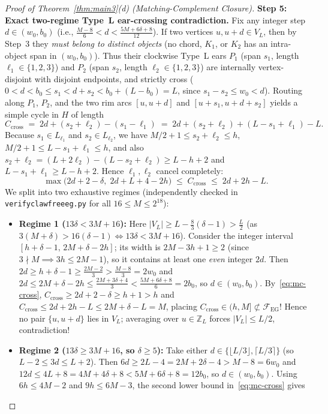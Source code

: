 \documentclass[11pt,reqno]{amsart}
\theoremstyle{plain}
\theoremstyle{definition}
\theoremstyle{remark}
\newcommand{\FEG}{\mathcal{F}_{\mathrm{EG}}}
\DeclareRobustCommand{\_}{\ifmmode\text{\textunderscore}\else\textunderscore\allowbreak\fi}
\begin{document}
\begin{proof}[Proof of Theorem~\ref{thm:main3}(d) (Matching-Complement Closure)]
\medskip
\noindent\textbf{Step 5: Exact two-regime Type~L ear-crossing contradiction.}
Fix any integer step $d \in (w_0, b_0)$ (i.e., $\frac{M - 8}{6} < d < \frac{5M + 6\delta + 8}{12}$). If two vertices $u, u + d \in V_L$, then by Step~3 they \emph{must belong to distinct objects} (no chord, $K_1$, or $K_2$ has an intra-object span in $(w_0, b_0)$). Thus their clockwise Type~L ears $P_1$ (span $s_1$, length $\ell_1 \in \{1, 2, 3\}$) and $P_2$ (span $s_2$, length $\ell_2 \in \{1, 2, 3\}$) are internally vertex-disjoint with disjoint endpoints, and strictly cross ($0 < d < b_0 \le s_1 < d + s_2 < b_0 + (L - b_0) = L$, since $s_1 - s_2 \le w_0 < d$). Routing along $P_1$, $P_2$, and the two rim arcs $[u, u + d]$ and $[u + s_1, u + d + s_2]$ yields a simple cycle in $H$ of length
\[
  C_{\mathrm{cross}} \;=\; 2d + (s_2 + \ell_2) - (s_1 - \ell_1) \;=\; 2d + (s_2 + \ell_2) + (L - s_1 + \ell_1) - L.
\]
Because $s_1 \in L_{\ell_1}$ and $s_2 \in L_{\ell_2}$, we have $M/2 + 1 \le s_2 + \ell_2 \le h$, $M/2 + 1 \le L - s_1 + \ell_1 \le h$, and also $s_2 + \ell_2 = (L + 2\ell_2) - (L - s_2 + \ell_2) \ge L - h + 2$ and $L - s_1 + \ell_1 \ge L - h + 2$. Hence $\ell_1, \ell_2$ cancel completely:
\begin{equation}\label{eq:mc-cross}
  \max\bigl(2d + 2 - \delta,\; 2d + L + 4 - 2h\bigr) \;\le\; C_{\mathrm{cross}} \;\le\; 2d + 2h - L.
\end{equation}
We split into two exhaustive regimes (independently checked in \texttt{verify\_clawfree\_eg.py} for all $16 \le M \le 2^{18}$):
\begin{itemize}[leftmargin=1.6em]
  \item \textbf{Regime 1 ($13\delta < 3M + 16$):} Here $|V_L| \ge L - \frac{8}{3}(\delta - 1) > \frac{L}{2}$ (as $3(M + \delta) > 16(\delta - 1) \iff 13\delta < 3M + 16$). Consider the integer interval $[h + \delta - 1,\, 2M + \delta - 2h]$; its width is $2M - 3h + 1 \ge 2$ (since $3 \nmid M \implies 3h \le 2M - 1$), so it contains at least one \emph{even} integer $2d$. Then $2d \ge h + \delta - 1 \ge \frac{2M - 2}{3} > \frac{M - 8}{3} = 2w_0$ and $2d \le 2M + \delta - 2h \le \frac{2M + 3\delta + 4}{3} < \frac{5M + 6\delta + 8}{6} = 2b_0$, so $d \in (w_0, b_0)$. By~\eqref{eq:mc-cross}, $C_{\mathrm{cross}} \ge 2d + 2 - \delta \ge h + 1 > h$ and $C_{\mathrm{cross}} \le 2d + 2h - L \le 2M + \delta - L = M$, placing $C_{\mathrm{cross}} \in (h, M] \not\subset \FEG$! Hence no pair $\{u, u + d\}$ lies in $V_L$; averaging over $u \in \mathbb{Z}_L$ forces $|V_L| \le L/2$, contradiction!
  \item \textbf{Regime 2 ($13\delta \ge 3M + 16$, so $\delta \ge 5$):} Take either $d \in \{\lfloor L/3 \rfloor, \lceil L/3 \rceil\}$ (so $L - 2 \le 3d \le L + 2$). Then $6d \ge 2L - 4 = 2M + 2\delta - 4 > M - 8 = 6w_0$ and $12d \le 4L + 8 = 4M + 4\delta + 8 < 5M + 6\delta + 8 = 12b_0$, so $d \in (w_0, b_0)$. Using $6h \le 4M - 2$ and $9h \le 6M - 3$, the second lower bound in~\eqref{eq:mc-cross} gives

\end{itemize}
\end{proof}
\end{document}
